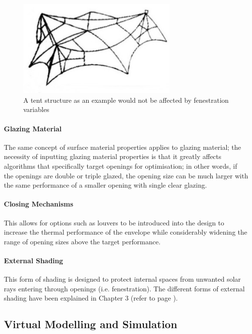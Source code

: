 \begin{figure}[H]
	\centering
	\includegraphics[width=8cm]{./Images/8-Tent}
	\caption[Tent Structure]{A tent structure as an example would not be affected by fenestration variables}
	\label{fig:tent}
\end{figure}
\paragraph{Glazing Material}\mbox{}

The same concept of surface material properties applies to glazing material; the necessity of inputting glazing material properties is that it greatly affects algorithms that specifically target openings for optimisation; in other words, if the openings are double or triple glazed, the opening size can be much larger with the same performance of a smaller opening with single clear glazing.

\paragraph{Closing Mechanisms}\mbox{}

This allows for options such as louvers to be introduced into the design to increase the thermal performance of the envelope while considerably widening the range of opening sizes above the target performance.

\paragraph{External Shading}\mbox{}

This form of shading is designed to protect internal spaces from unwanted solar rays entering through openings (i.e. fenestration). The different forms of external shading have been explained in Chapter 3 (refer to page \pageref{Shading}).

\clearpage
\subsection{Virtual Modelling and Simulation}
\label{sec:SimulationModel}

